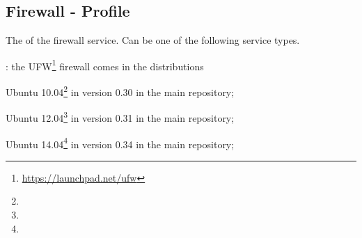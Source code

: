 \label{sec:firewall_profile}
\subsection{Firewall - Profile}


The  of the firewall service. Can be one of the following 
service types.
\begin{asparaitem}
%
\item[\qcode{ufw}:] 
the UFW\footnote{\url{https://launchpad.net/ufw}} firewall comes in the distributions 
\begin{compactitem}
\item[\TheDistribution{ubuntu}] Ubuntu 10.04\footnote{\TheUbuntuMaverickLTSDate} in version 0.30 in the main repository;
\item[\TheDistribution{ubuntu}] Ubuntu 12.04\footnote{\TheUbuntuPreciseLTSDate} in version 0.31 in the main repository;
\item[\TheDistribution{ubuntu}] Ubuntu 14.04\footnote{\TheUbuntuTrustyLTSDate} in version 0.34 in the main repository;
\end{compactitem}
%
\end{asparaitem}

